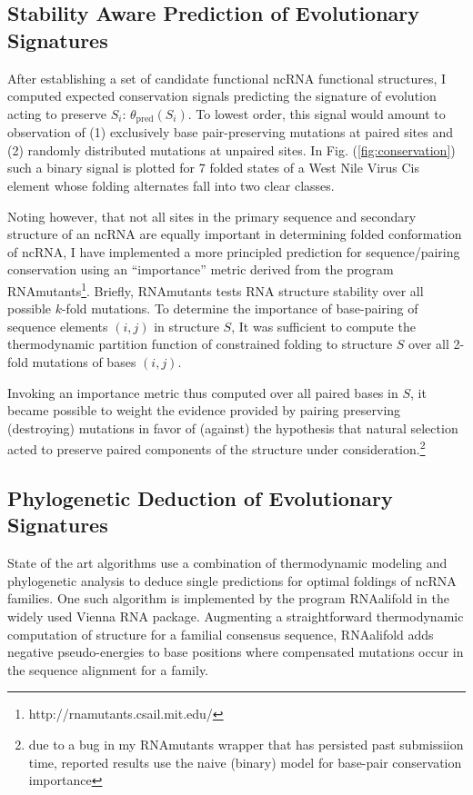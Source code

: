 \documentclass[12pt,a4paper]{article}
\begin{document}
\subsection{Stability Aware Prediction of Evolutionary Signatures}\label{prediction}
After establishing a set of candidate functional ncRNA functional structures, I computed expected conservation signals predicting the signature of evolution acting to preserve $S_i$: $\theta_{\text{pred}}(S_i)$. To lowest order, this signal would amount to observation of (1) exclusively base pair-preserving mutations at paired sites and (2) randomly distributed mutations at unpaired sites. In Fig. (\ref{fig:conservation}) such a binary signal is plotted for 7 folded states of a West Nile Virus Cis element whose folding alternates fall into two clear classes.

Noting however, that not all sites in the primary sequence and secondary structure of an ncRNA are equally important in determining folded conformation of ncRNA, I have implemented a more principled prediction for sequence/pairing conservation using an ``importance'' metric derived from the program RNAmutants\footnote{http://rnamutants.csail.mit.edu/}. Briefly, RNAmutants tests RNA structure stability over all possible $k$-fold mutations. To determine the importance of base-pairing of sequence elements $(i,j)$ in structure $S$, It was sufficient to compute the thermodynamic partition function of constrained folding to structure $S$ over all 2-fold mutations of bases $(i,j)$. 

Invoking an importance metric thus computed over all paired bases in $S$, it became possible to weight the evidence provided by pairing preserving (destroying) mutations in favor of (against) the hypothesis that natural selection acted to preserve paired components of the structure under consideration.\footnote{due to a bug in my RNAmutants wrapper that has persisted past submissiion time, reported results use the naive (binary) model for base-pair conservation importance}

\subsection{Phylogenetic  Deduction of Evolutionary Signatures}\label{deduction}
State of the art algorithms use a combination of thermodynamic modeling and phylogenetic analysis to deduce single predictions for optimal foldings of ncRNA families. One such algorithm is implemented by the program RNAalifold in the widely used Vienna RNA package. Augmenting a straightforward thermodynamic computation of structure for a familial consensus sequence, RNAalifold adds negative pseudo-energies to base positions where compensated mutations occur in the sequence alignment for a family. 
\end{document}
